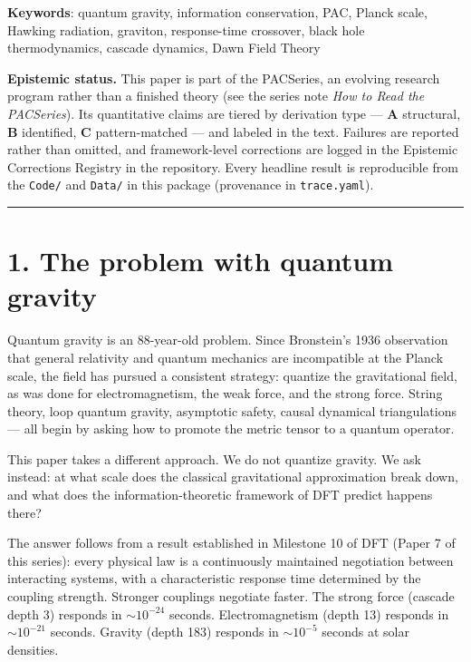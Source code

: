 \documentclass[11pt,a4paper]{article}
\begin{document}
\textbf{Keywords}: quantum gravity, information conservation, PAC, Planck scale, Hawking radiation, graviton, response-time crossover, black hole thermodynamics, cascade dynamics, Dawn Field Theory

\textbf{Epistemic status.} This paper is part of the PACSeries, an evolving research program rather than a finished theory (see the series note \emph{How to Read the PACSeries}). Its quantitative claims are tiered by derivation type — \textbf{A} structural, \textbf{B} identified, \textbf{C} pattern-matched — and labeled in the text. Failures are reported rather than omitted, and framework-level corrections are logged in the Epistemic Corrections Registry in the repository. Every headline result is reproducible from the \texttt{Code/} and \texttt{Data/} in this package (provenance in \texttt{trace.yaml}).

\begin{center}\rule{0.5\linewidth}{0.4pt}\end{center}

\section*{1. The problem with quantum gravity}

Quantum gravity is an 88-year-old problem. Since Bronstein's 1936 observation that general relativity and quantum mechanics are incompatible at the Planck scale, the field has pursued a consistent strategy: quantize the gravitational field, as was done for electromagnetism, the weak force, and the strong force. String theory, loop quantum gravity, asymptotic safety, causal dynamical triangulations — all begin by asking how to promote the metric tensor to a quantum operator.

This paper takes a different approach. We do not quantize gravity. We ask instead: at what scale does the classical gravitational approximation break down, and what does the information-theoretic framework of DFT predict happens there?

The answer follows from a result established in Milestone 10 of DFT (Paper 7 of this series): every physical law is a continuously maintained negotiation between interacting systems, with a characteristic response time determined by the coupling strength. Stronger couplings negotiate faster. The strong force (cascade depth 3) responds in $\sim 10^{-24}$ seconds. Electromagnetism (depth 13) responds in $\sim 10^{-21}$ seconds. Gravity (depth 183) responds in $\sim 10^{-5}$ seconds at solar densities.
\end{document}
